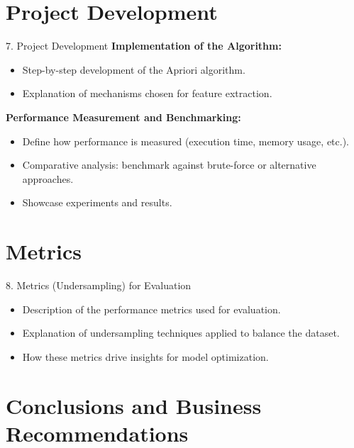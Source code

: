 \documentclass{beamer}
\begin{document}
\section{Project Development}

\begin{frame}{7. Project Development}
    \textbf{Implementation of the Algorithm:}
    \begin{itemize}
        \item Step-by-step development of the Apriori algorithm.
        \item Explanation of mechanisms chosen for feature extraction.
    \end{itemize}
    \vspace{0.5em}
    \textbf{Performance Measurement and Benchmarking:}
    \begin{itemize}
        \item Define how performance is measured (execution time, memory usage, etc.).
        \item Comparative analysis: benchmark against brute-force or alternative approaches.
        \item Showcase experiments and results.
    \end{itemize}
\end{frame}

\section{Metrics}

\begin{frame}{8. Metrics (Undersampling) for Evaluation}
    \begin{itemize}
        \item Description of the performance metrics used for evaluation.
        \item Explanation of undersampling techniques applied to balance the dataset.
        \item How these metrics drive insights for model optimization.
    \end{itemize}
\end{frame}

\section{Conclusions and Business Recommendations}
\end{document}
